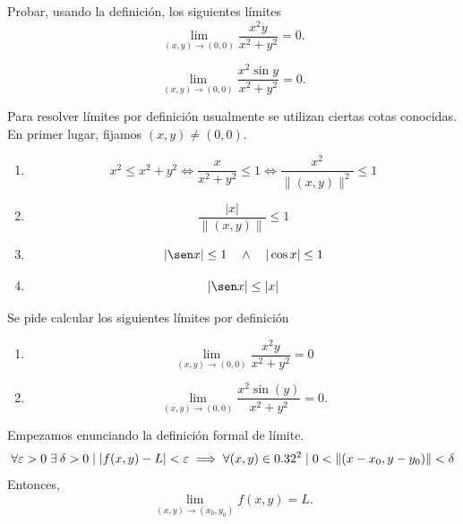 \begin{example} Probar, usando la definici\'on, los siguientes l\'imites
 \[
  \lim_{(x,y) \to (0,0)} \frac{x^2  y}{x^2 + y^2} = 0.
 \]

 \[
  \lim_{(x,y) \to (0,0)} \frac{x^2 \sin y}{x^2 + y^2} = 0.
 \]
\end{example}

\begin{obs} Para resolver límites por definici\'on usualmente se utilizan ciertas cotas conocidas. En primer lugar, fijamos $(x,y)\neq (0,0)$.
  \begin{enumerate}
  \item 
  \[
  x^2\leq x^2+y^2 \iff \frac{x}{ x^2+y^2}\leq 1 \iff \frac{x^2}{\|(x,y)\|^2}\leq 1
  \]
  \item 
  \[
  \frac{|x|}{\|(x,y)\|}\leq 1
  \]
  \item 
  \[
  |\sen x|\leq 1 \quad\land\quad
  |\cos x|\leq 1 
  \]
  \item 
  \[
   |\sen x|\leq |x|
  \]
  
  \end{enumerate}
\end{obs}
Se pide calcular los siguientes límites por definición
\begin{enumerate}
  \item
  \[
  \lim_{(x, y) \to (0, 0)} \frac{x^2 y}{x^2 + y^2} = 0
  \]
  
  \item
  \[
  \lim_{(x, y) \to (0, 0)} \frac{x^2 \sin(y)}{x^2 + y^2} = 0.
  \]
\end{enumerate}

Empezamos enunciando la definición formal de límite.
\[
\forall \varepsilon > 0\; \exists\:\delta > 0 \;|\; |f(x,y) - L| < \varepsilon  \implies \forall (x,y) \in 0.32^2 \;|\;0 < \|(x-x_0,y-y_0)\| < \delta
\]
Entonces,
\[
\lim_{(x,y) \to (x_0,y_0)} f(x,y) = L.
\]

